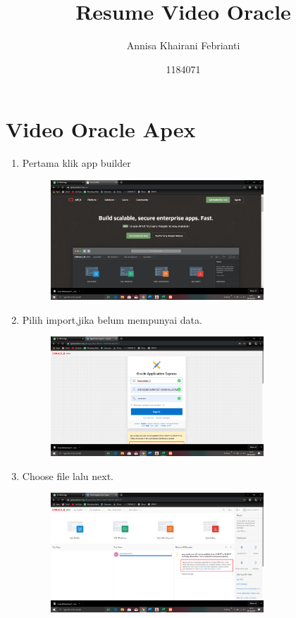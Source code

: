 \documentclass{article}
\title{Resume Video Oracle}
\author{Annisa Khairani Febrianti}
\date{1184071}
\begin{document}
\maketitle

\section{Video Oracle Apex}
\begin{enumerate}
    \item Pertama klik app builder
    \begin{figure}[h]
            \centerline{\includegraphics[width=8cm]{image/1.PNG}}
            \end{figure}
    \item Pilih import,jika belum mempunyai data.
    \begin{figure}[h]
            \centerline{\includegraphics[width=8cm]{image/2.png}}
            \end{figure}
    \newpage\item Choose file lalu next.
    \begin{figure}[h]
            \centerline{\includegraphics[width=8cm]{image/3.png}}

\end{figure}
\end{enumerate}
\end{document}

